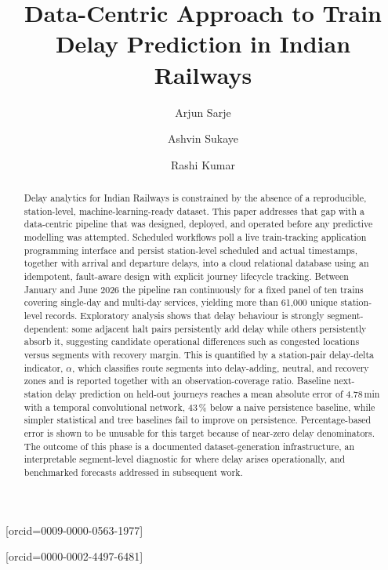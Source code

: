 \documentclass[a4paper,fleqn]{cas-dc}
\begin{document}
\let\WriteBookmarks\relax
\def\floatpagepagefraction{1}
\def\textpagefraction{.001}


\title[mode=title]{Data-Centric Approach to Train Delay Prediction in Indian Railways}

\author[1]{Arjun Sarje}[orcid=0009-0000-0563-1977]
\cormark[1]

\author[1]{Ashvin Sukaye}

\author[1]{Rashi Kumar}[orcid=0000-0002-4497-6481]



\begin{abstract}
Delay analytics for Indian Railways is constrained by the absence of a
reproducible, station-level, machine-learning-ready dataset. This paper
addresses that gap with a data-centric pipeline that was designed, deployed,
and operated before any predictive modelling was attempted. Scheduled
workflows poll a live train-tracking application programming interface and
persist station-level scheduled and actual timestamps, together with arrival
and departure delays, into a cloud relational database using an idempotent,
fault-aware design with explicit journey lifecycle tracking. Between January
and June 2026 the pipeline ran continuously for a fixed panel of ten trains
covering single-day and multi-day services, yielding more than 61{,}000
unique station-level records. Exploratory analysis shows that delay behaviour
is strongly segment-dependent: some adjacent halt pairs persistently add delay
while others persistently absorb it, suggesting candidate operational differences
such as congested locations versus segments with recovery margin. This is quantified
by a station-pair delay-delta indicator, $\alpha$, which classifies route
segments into delay-adding, neutral, and recovery zones and is reported
together with an observation-coverage ratio. Baseline next-station delay
prediction on held-out journeys reaches a mean absolute error of 4.78\,min
with a temporal convolutional network, 43\,\% below a naive persistence
baseline, while simpler statistical and tree baselines fail to improve on
persistence. Percentage-based error is shown to be unusable for this target
because of near-zero delay denominators. The outcome of this phase is a
documented dataset-generation infrastructure, an interpretable segment-level
diagnostic for where delay arises operationally, and benchmarked forecasts 
addressed in subsequent work.
\end{abstract}
\end{document}
